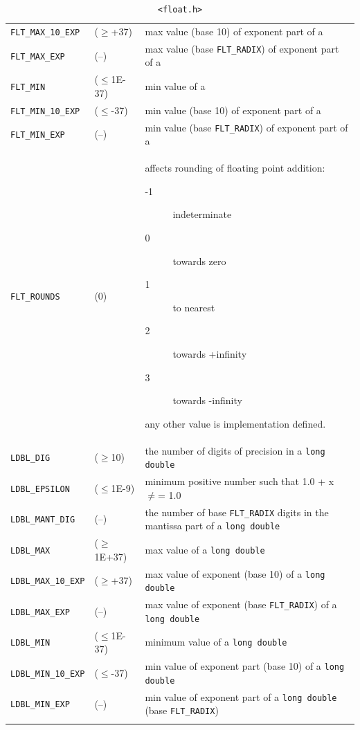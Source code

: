 \begin{longtable}{lp{}p{}}
     \texttt{FLT\_MAX\_10\_EXP} & ($\geq$+37) & max value (base 10) of exponent part of a \float{}    \\
     \texttt{FLT\_MAX\_EXP} & (--) & max value (base \texttt{FLT\_RADIX}) of exponent part of a \float{} \\
     \texttt{FLT\_MIN} & ($\leq$1E-37) & min value of a \float{} \\
     \texttt{FLT\_MIN\_10\_EXP} & ($\leq$-37) & min value (base 10) of exponent part of a \float{}   \\
     \texttt{FLT\_MIN\_EXP} & (--) & min value (base \texttt{FLT\_RADIX}) of exponent part of a \float{}  \\
     \texttt{FLT\_ROUNDS} & (0) & affects rounding of floating point addition:

      \begin{description}
       \item[-1] indeterminate
       \item[0] towards zero
       \item[1] to nearest
       \item[2] towards +infinity
       \item[3] towards -infinity
      \end{description}
      any other value is implementation defined.    \\

     \texttt{LDBL\_DIG} & ($\geq$10) & the number of digits of precision in a \texttt{long double}    \\
     \texttt{LDBL\_EPSILON} & ($\leq$1E-9) & minimum positive number such that 1.0 + x $\neq$= 1.0    \\
     \texttt{LDBL\_MANT\_DIG} & (--) & the number of base \texttt{FLT\_RADIX} digits in the mantissa part of a \texttt{long double} \\
     \texttt{LDBL\_MAX} & ($\geq$1E+37) & max value of a \texttt{long double} \\
     \texttt{LDBL\_MAX\_10\_EXP} & ($\geq$+37) &  max value of exponent (base 10) of a \texttt{long double} \\
     \texttt{LDBL\_MAX\_EXP} & (--) & max value of exponent (base \texttt{FLT\_RADIX}) of a \texttt{long double} \\
     \texttt{LDBL\_MIN} & ($\leq$1E-37) & minimum value of a \texttt{long double} \\
     \texttt{LDBL\_MIN\_10\_EXP} & ($\leq$-37) & min value of exponent part (base 10) of a \texttt{long double} \\
     \texttt{LDBL\_MIN\_EXP} & (--) & min value of exponent part of a \texttt{long double} (base \texttt{FLT\_RADIX})    \\
    \bottomrule
  \caption{\label{tab:float_h}\texttt{<float.h>}}
\end{longtable}



